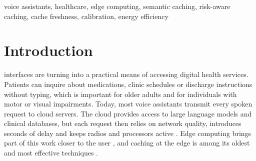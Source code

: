 \documentclass[journal]{IEEEtran}
\begin{document}
\begin{IEEEkeywords}
voice assistants, healthcare, edge computing, semantic caching, risk-aware caching, cache freshness, calibration, energy efficiency
\end{IEEEkeywords}

\IEEEpeerreviewmaketitle

\section{Introduction}
 interfaces are turning into a practical means of accessing digital health services. Patients can inquire about medications, clinic schedules or discharge instructions without typing, which is important for older adults and for individuals with motor or visual impairments. Today, most voice assistants transmit every spoken request to cloud servers. The cloud provides access to large language models and clinical databases, but each request then relies on network quality, introduces seconds of delay and keeps radios and processors active \cite{montoya2025,speckhard2023}. Edge computing brings part of this work closer to the user \cite{shi2016,satya2017,zhou2019}, and caching at the edge is among its oldest and most effective techniques \cite{wang2014,breslau1999}.
\end{document}
